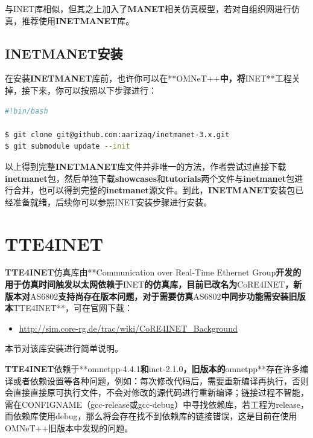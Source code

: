 与INET库相似，但其之上加入了\textbf{MANET}相关仿真模型，若对自组织网进行仿真，推荐使用\textbf{INETMANET}库。

\subsection{INETMANET安装}
\label{inetmanet安装}

在安装\textbf{INETMANET}库前，也许你可以在**OMNeT++\textbf{中，将}INET**工程关掉，接下来，你可以按照以下步骤进行：

\begin{lstlisting}[language=bash]
#!bin/bash

$ git clone git@github.com:aarizaq/inetmanet-3.x.git
$ git submodule update --init

\end{lstlisting}

以上得到完整\textbf{INETMANET}库文件并非唯一的方法，作者尝试过直接下载\textbf{inetmanet}包，然后单独下载\textbf{showcases}和\textbf{tutorials}两个文件与\textbf{inetmanet}包进行合并，也可以得到完整的\textbf{inetmanet}源文件。到此，\textbf{INETMANET}安装包已经准备就绪，后续你可以参照INET安装步骤进行安装。

\section{TTE4INET}
\label{tte4inet}

\textbf{TTE4INET}仿真库由**Communication over Real-Time Ethernet Group\textbf{开发的用于仿真时间触发以太网依赖于}INET\textbf{的仿真库，目前已改名为}CoRE4INET\textbf{，新版本对}AS6802\textbf{支持尚存在版本问题，对于需要仿真}AS6802\textbf{中同步功能需安装旧版本}TTE4INET**，可在官网下载：

\begin{itemize}
\item \href{http://sim.core-rg.de/trac/wiki/CoRE4INET_Background}{http:\slash \slash sim.core-rg.de\slash trac\slash wiki\slash CoRE4INET\_Background}

\end{itemize}

本节对该库安装进行简单说明。

\textbf{TTE4INET}依赖于**omnetpp-4.4.1\textbf{和}inet-2.1.0\textbf{，旧版本的}omnetpp**存在许多编译或者依赖设置等各种问题，例如：每次修改代码后，需要重新编译再执行，否则会直接直接原可执行文件，不会对修改的源代码进行重新编译；链接过程不智能，需在CONFIGNAME（gcc-release或gcc-debug）中寻找依赖库，若工程为release，而依赖库使用debug，那么将会存在找不到依赖库的链接错误，这是目前在使用OMNeT++旧版本中发现的问题。

